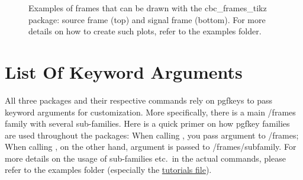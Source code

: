 \documentclass[
    DIV=11,
    BCOR=0mm,
    paper=a4,
    fontsize=11pt,
    twoside=false,
    titlepage=true
]{scrartcl}
\newcommand{\code}[1]{{\color{codecolor}\ttfamily#1}}  %
\begin{document}
\begin{figure}[h]
    \centering


    \caption{Examples of frames that can be drawn with the \code{cbc\_frames\_tikz} package: source frame (top) and signal frame (bottom). For more details on how to create such plots, refer to the examples folder.}

    \label{fig:examples}
\end{figure}



    \section{List Of Keyword Arguments}
All three packages and their respective commands rely on \code{pgfkeys} to pass keyword arguments for customization. More specifically, there is a main \code{/frames} family with several sub-families. Here is a quick primer on how pgfkey families are used throughout the packages: When calling \code{\string\drawframes[argument=value]}, you pass \code{argument} to \code{/frames}; When calling \code{\string\drawframes[subfamily={argument=value,argument2=value2}]}, on the other hand, \code{argument} is passed to \code{/frames/subfamily}. For more details on the usage of sub-families etc.~in the actual commands, please refer to the examples folder (especially the \href{https://github.com/MaxMelching/gwframes/tree/main/examples/tutorials.tex}{tutorials file}).
\end{document}
